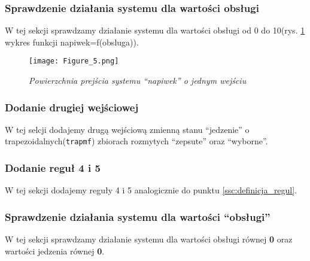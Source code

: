 \subsubsection{Sprawdzenie działania systemu dla wartości obsługi}\label{ssc:sprawdzenie_dzialania_obsluga}

W tej sekcji sprawdzamy działanie systemu dla wartości obsługi od 0 do 10(rys. \ref{fig:napiwek_obsluga} wykres funkcji napiwek=f(obsluga)).



\begin{figure}[H]
	\centering
	\texttt{[image: Figure\_5.png]}
	\caption{\textit{Powierzchnia prejścia systemu ``napiwek'' o jednym wejściu}}
	\label{fig:napiwek_obsluga}
\end{figure}

\subsubsection{Dodanie drugiej wejściowej}\label{ssc:dodanie_wejsciowej}
 
W tej selcji dodajemy drugą wejściową zmienną stanu ``jedzenie'' o trapezoidalnych(\verb|trapmf|) zbiorach rozmytych ``zepsute'' oraz ``wyborne''.




\subsubsection{Dodanie reguł 4 i 5}\label{ssc:dodanie_regul45}

W tej sekcji dodajemy reguły 4 i 5 analogicznie do punktu \ref{ssc:definicja_regul}.



\subsubsection{Sprawdzenie działania systemu dla wartości ``obsługi''}\label{ssc:sprawdzenie_dzialania_wartosc_obsluga}

W tej sekcji sprawdzamy działanie systemu dla wartości obsługi równej \textbf{0} oraz wartości jedzenia równej \textbf{0}.



